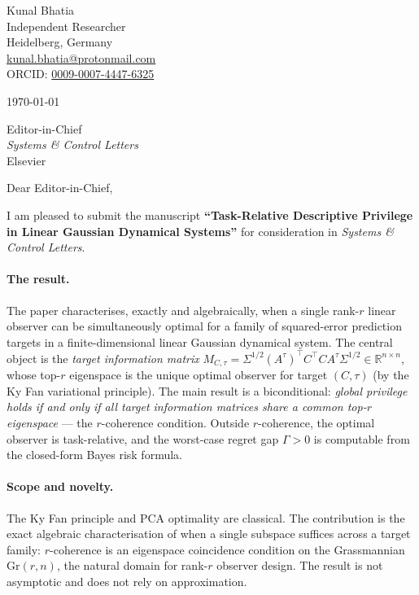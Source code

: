 \documentclass[12pt]{article}
\begin{document}
\noindent
Kunal Bhatia\\
Independent Researcher\\
Heidelberg, Germany\\
\href{mailto:kunal.bhatia@protonmail.com}{kunal.bhatia@protonmail.com}\\
ORCID: \href{https://orcid.org/0009-0007-4447-6325}{0009-0007-4447-6325}

\bigskip
\noindent\today

\bigskip
\noindent
Editor-in-Chief\\
\textit{Systems \& Control Letters}\\
Elsevier

\bigskip

\noindent Dear Editor-in-Chief,

\bigskip

I am pleased to submit the manuscript \textbf{``Task-Relative Descriptive
Privilege in Linear Gaussian Dynamical Systems''} for consideration in
\textit{Systems \& Control Letters}.

\paragraph{The result.}
The paper characterises, exactly and algebraically, when a single rank-$r$
linear observer can be simultaneously optimal for a family of squared-error
prediction targets in a finite-dimensional linear Gaussian dynamical system.
The central object is the \emph{target information matrix}
$M_{C,\tau} = \Sigma^{1/2}(A^\tau)^\top C^\top C A^\tau \Sigma^{1/2} \in \mathbb{R}^{n\times n}$,
whose top-$r$ eigenspace is the unique optimal observer for target $(C,\tau)$
(by the Ky Fan variational principle).
The main result is a biconditional: \emph{global privilege holds if and only
if all target information matrices share a common top-$r$ eigenspace} --- the
$r$-coherence condition.
Outside $r$-coherence, the optimal observer is task-relative, and the
worst-case regret gap $\Gamma > 0$ is computable from the closed-form Bayes
risk formula.

\paragraph{Scope and novelty.}
The Ky Fan principle and PCA optimality are classical.
The contribution is the exact algebraic characterisation of when a single
subspace suffices across a target family: $r$-coherence is an eigenspace
coincidence condition on the Grassmannian $\mathrm{Gr}(r,n)$, the natural
domain for rank-$r$ observer design.
The result is not asymptotic and does not rely on approximation.
\end{document}
